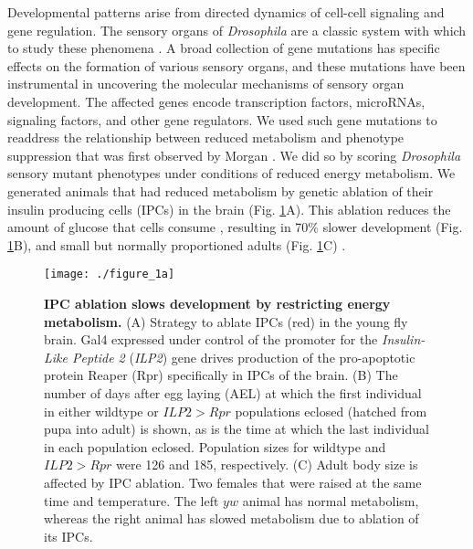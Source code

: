 Developmental patterns arise from directed dynamics of cell-cell signaling and gene regulation. The sensory organs of \textit{Drosophila} are a classic system with which to study these phenomena \cite{Quan2005}. A broad collection of gene mutations has specific effects on the formation of various sensory organs, and these mutations have been instrumental in uncovering the molecular mechanisms of sensory organ development. The affected genes encode transcription factors, microRNAs, signaling factors, and other gene regulators. We used such gene mutations to readdress the relationship between reduced metabolism and phenotype suppression that was first observed by Morgan \cite{Morgan1915,Morgan1929}. We did so by scoring \textit{Drosophila} sensory mutant phenotypes under conditions of reduced energy metabolism. We generated animals that had reduced metabolism by genetic ablation of their insulin producing cells (IPCs) in the brain (Fig. \ref{fig:metabolism:fig1a}A). This ablation reduces the amount of glucose that cells consume \cite{Rulifson2002}, resulting in 70\% slower development (Fig. \ref{fig:metabolism:fig1a}B), and small but normally proportioned adults (Fig. \ref{fig:metabolism:fig1a}C) \cite{Rulifson2002}.

\begin{figure}[h!]
\centering
\texttt{[image: ./figure\_1a]}
\caption[IPC ablation slows development by restricting energy metabolism.]{\textbf{IPC ablation slows development by restricting energy metabolism.} (A) Strategy to ablate IPCs (red) in the young fly brain. Gal4 expressed under control of the promoter for the \textit{Insulin-Like Peptide 2} (\textit{ILP2}) gene drives production of the pro-apoptotic protein Reaper (Rpr) specifically in IPCs of the brain. (B) The number of days after egg laying (AEL) at which the first individual in either wildtype or $ILP2>Rpr$ populations eclosed (hatched from pupa into adult) is shown, as is the time at which the last individual in each population eclosed. Population sizes for wildtype and $ILP2>Rpr$ were 126 and 185, respectively. (C) Adult body size is affected by IPC ablation. Two females that were raised at the same time and temperature. The left $yw$ animal has normal metabolism, whereas the right animal has slowed metabolism due to ablation of its IPCs.}
\label{fig:metabolism:fig1a}
\end{figure}

